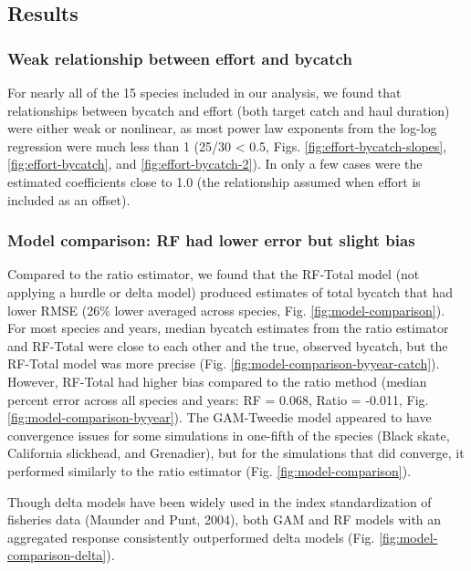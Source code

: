 \documentclass[]{article}
\begin{document}
\subsection{Results}\label{results}

\subsubsection{Weak relationship between effort and
bycatch}\label{weak-relationship-between-effort-and-bycatch}

For nearly all of the 15 species included in our analysis, we found that
relationships between bycatch and effort (both target catch and haul
duration) were either weak or nonlinear, as most power law exponents
from the log-log regression were much less than 1 (25/30 \textless{}
0.5, Figs. \ref{fig:effort-bycatch-slopes}, \ref{fig:effort-bycatch},
and \ref{fig:effort-bycatch-2}). In only a few cases were the estimated
coefficients close to 1.0 (the relationship assumed when effort is
included as an offset).

\subsubsection{Model comparison: RF had lower error but slight
bias}\label{model-comparison-rf-had-lower-error-but-slight-bias}

Compared to the ratio estimator, we found that the RF-Total model (not
applying a hurdle or delta model) produced estimates of total bycatch
that had lower RMSE (26\% lower averaged across species, Fig.
\ref{fig:model-comparison}). For most species and years, median bycatch
estimates from the ratio estimator and RF-Total were close to each other
and the true, observed bycatch, but the RF-Total model was more precise
(Fig. \ref{fig:model-comparison-byyear-catch}). However, RF-Total had
higher bias compared to the ratio method (median percent error across
all species and years: RF = 0.068, Ratio = -0.011, Fig.
\ref{fig:model-comparison-byyear}). The GAM-Tweedie model appeared to
have convergence issues for some simulations in one-fifth of the species
(Black skate, California slickhead, and Grenadier), but for the
simulations that did converge, it performed similarly to the ratio
estimator (Fig. \ref{fig:model-comparison}).

Though delta models have been widely used in the index standardization
of fisheries data (Maunder and Punt, 2004), both GAM and RF models with
an aggregated response consistently outperformed delta models (Fig.
\ref{fig:model-comparison-delta}).
\end{document}
